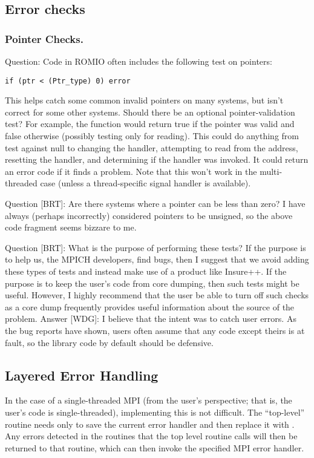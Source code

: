 \documentclass{article}
\begin{document}
\subsection{Error checks}

\subsubsection{Pointer Checks.}
Question: Code in ROMIO often includes the following test on pointers:
\begin{verbatim}
if (ptr < (Ptr_type) 0) error
\end{verbatim}
This helps catch some common invalid pointers on many systems, but isn't
correct for some other systems.  Should there be an optional
pointer-validation test?  For example, the function
 would return true if the pointer was valid and
false otherwise (possibly testing only for reading).  This could do anything
from test against null to changing the  handler, attempting to
read from the address, resetting the handler, and determining if the handler
was invoked.  It could return an error code if it finds a problem.
Note that this won't work in the multi-threaded case (unless a
thread-specific signal handler is available).

Question [BRT]: Are there systems where a pointer can be less
than zero?  I have always (perhaps incorrectly) considered pointers to
be unsigned, so the above code fragment seems bizzare to me.  

Question [BRT]: What is the purpose of performing these tests?  If the
purpose is to help us, the MPICH developers, find bugs, then I suggest
that we avoid adding these types of tests and instead make use of a
product like Insure++.  If the purpose is to keep the user's code from
core dumping, then such tests might be useful.  However, I highly
recommend that the user be able to turn off such checks as a core dump
frequently provides useful information about the source of the
problem.
Answer [WDG]: I believe that the intent was to catch user errors.  As the bug
reports have shown, users often assume that any code except theirs is at
fault, so the library code by default should be defensive.  

\subsection{Layered Error Handling}
In the case of a single-threaded MPI (from the
user's perspective; that is, the user's code is single-threaded),
implementing this is not difficult.  The ``top-level'' routine needs
only to save the current error handler and then replace it with
.  Any errors detected in the routines
that the top level routine calls will then be returned to that
routine, which can then invoke the specified MPI error handler.
\end{document}
